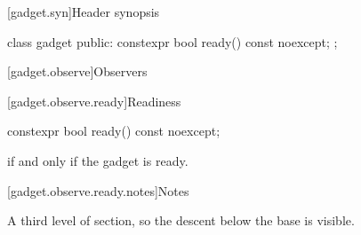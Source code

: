 [gadget.syn]{Header synopsis}

\begin{codeblock}
class gadget {
public:
  constexpr bool ready() const noexcept;
};
\end{codeblock}

[gadget.observe]{Observers}

[gadget.observe.ready]{Readiness}

\begin{itemdecl}
constexpr bool ready() const noexcept;
\end{itemdecl}

\begin{itemdescr}
\pnum
\returns
{} if and only if the gadget is ready.
\end{itemdescr}

[gadget.observe.ready.notes]{Notes}

\pnum
A third level of section, so the descent below the base is visible.
